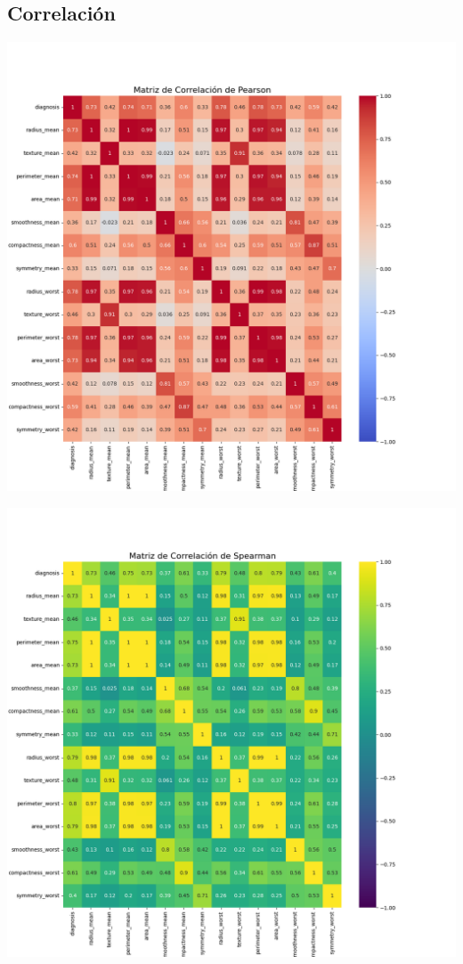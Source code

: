 \documentclass[a4paper, 12pt]{article}
\begin{document}
\subsection{Correlación}
	\includegraphics[width = \textwidth]{../Plots/plots_corr/corr_matrix/matriz_correlacion_pearson.png}



	\includegraphics[width = \textwidth]{../Plots/plots_corr/corr_matrix/matriz_correlacion_spearman.png}
\end{document}
